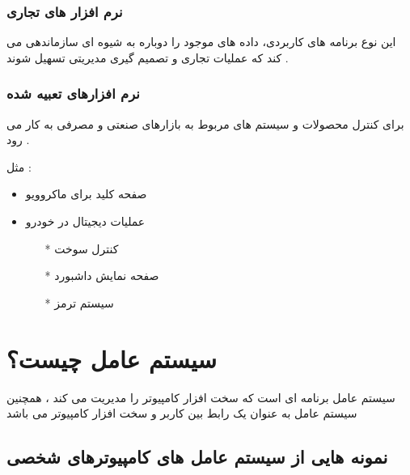 \documentclass[12pt]{book}
\begin{document}
\subsubsection{نرم افزار های تجاری}
این نوع برنامه های کاربردی، داده های موجود را دوباره به شیوه ای سازماندهی می کند که عملیات تجاری و تصمیم گیری مدیریتی تسهیل شوند .


\subsubsection{نرم افزارهای تعبیه شده}
برای کنترل محصولات و سیستم های مربوط به بازارهای صنعتی و مصرفی به کار می رود .

مثل : 

\begin{itemize}
	\item صفحه کلید برای ماکروویو
	\item عملیات دیجیتال در خودرو
	\begin{itemize}
		\item[*] کنترل سوخت
		\item[*] صفحه نمایش داشبورد
		\item[*] سیستم ترمز
	\end{itemize}
\end{itemize}


\section{سیستم عامل چیست؟}

سیستم عامل برنامه ای است که سخت افزار کامپیوتر را مدیریت می کند ، همچنین سیستم عامل به عنوان یک رابط بین کاربر و سخت افزار کامپیوتر می باشد 

\subsection{نمونه هایی از سیستم عامل های کامپیوترهای شخصی}
\end{document}
